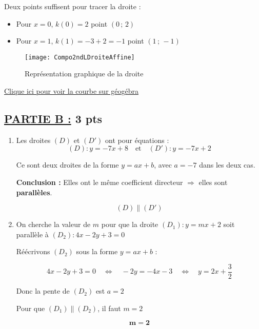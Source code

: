 \documentclass[12pt,a4paper]{article}
\begin{document}
\begin{enumerate}
\begin{enumerate}
        Deux points suffisent pour tracer la droite :
        \begin{itemize}
            \item Pour \( x = 0 \), \( k(0) = 2 \)  point \( (0\,;\,2) \)
            \item Pour \( x = 1 \), \( k(1) = -3 + 2 = -1 \)  point \( (1\,;\,-1) \)
        \end{itemize}

\begin{center}
\begin{figure}[H]%
\centering
\texttt{[image: Compo2ndLDroiteAffine]}
\caption{Représentation graphique de la droite}
\label{fig:monimage}
\end{figure}
\href{https://www.geogebra.org/classic/erty3fcq}{Clique ici pour voir la courbe sur géogébra}\\
\end{center}

    \end{enumerate}
\end{enumerate}


\vspace{0.5cm}

\subsection*{\underline{PARTIE B :} 3 pts}

\begin{enumerate}
    \item Les droites \((D)\) et \((D')\) ont pour équations :
    \[
    (D) : y = -7x + 8 \quad \text{et} \quad (D') : y = -7x + 2
    \]

    Ce sont deux droites de la forme \( y = ax + b \), avec \( a = -7 \) dans les deux cas.

    \textbf{Conclusion :} Elles ont le même coefficient directeur \( \Rightarrow \) elles sont \textbf{parallèles}.

    \[
    \boxed{(D) \parallel (D')}
    \]

    \item On cherche la valeur de \( m \) pour que la droite \( (D_1) : y = mx + 2 \) soit parallèle à \( (D_2) : 4x - 2y + 3 = 0 \)

    Réécrivons \( (D_2) \) sous la forme \( y = ax + b \) :

    \[
    4x - 2y + 3 = 0 \quad \Leftrightarrow \quad -2y = -4x - 3 \quad \Leftrightarrow \quad y = 2x + \frac{3}{2}
    \]

    Donc la pente de \( (D_2) \) est \( a = 2 \)

    Pour que \( (D_1) \parallel (D_2) \), il faut \( m = 2 \)

    \begin{resultbox}
    \[
    \mathbf{m = 2}
    \]
		\end{resultbox}
\end{enumerate}
\end{document}
